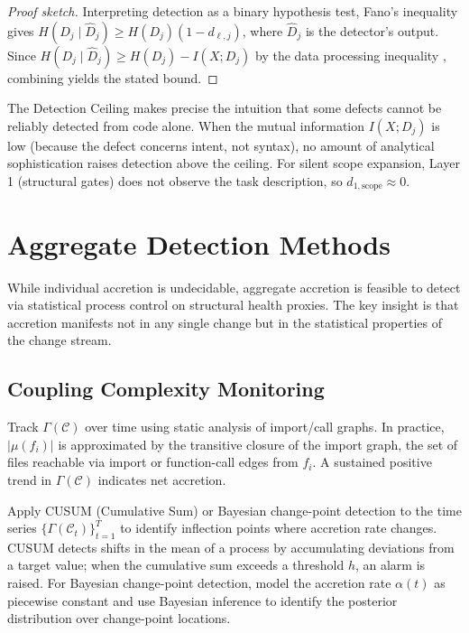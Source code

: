 \documentclass[11pt, a4paper, logo, copyright]{googledeepmind}
\begin{document}
\begin{proof}[Proof sketch]
Interpreting detection as a binary hypothesis test, Fano's inequality gives $H(D_j \mid \hat{D}_j) \geq H(D_j)(1 - d_{\ell,j})$, where $\hat{D}_j$ is the detector's output. Since $H(D_j \mid \hat{D}_j) \geq H(D_j) - I(X; D_j)$ by the data processing inequality \citep{cover2006}, combining yields the stated bound.
\end{proof}

The Detection Ceiling makes precise the intuition that some defects cannot be reliably detected from code alone. When the mutual information $I(X; D_j)$ is low (because the defect concerns intent, not syntax), no amount of analytical sophistication raises detection above the ceiling. For silent scope expansion, Layer 1 (structural gates) does not observe the task description, so $d_{1,\text{scope}} \approx 0$.


\section{Aggregate Detection Methods}
\label{sec:aggregate}

While individual accretion is undecidable, aggregate accretion is feasible to detect via statistical process control on structural health proxies. The key insight is that accretion manifests not in any single change but in the statistical properties of the change stream.

\subsection{Coupling Complexity Monitoring}

Track $\Gamma(\mathcal{C})$ over time using static analysis of import/call graphs. In practice, $|\mu(f_i)|$ is approximated by the transitive closure of the import graph, the set of files reachable via import or function-call edges from $f_i$. A sustained positive trend in $\Gamma(\mathcal{C})$ indicates net accretion.

Apply CUSUM (Cumulative Sum) or Bayesian change-point detection to the time series $\{\Gamma(\mathcal{C}_t)\}_{t=1}^T$ to identify inflection points where accretion rate changes. CUSUM detects shifts in the mean of a process by accumulating deviations from a target value; when the cumulative sum exceeds a threshold $h$, an alarm is raised. For Bayesian change-point detection, model the accretion rate $\alpha(t)$ as piecewise constant and use Bayesian inference to identify the posterior distribution over change-point locations.
\end{document}
